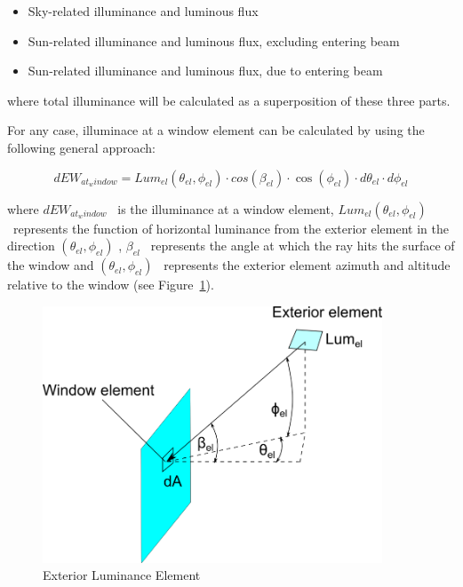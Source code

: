 \begin{itemize}
\item
  Sky-related illuminance and luminous flux
\item
  Sun-related illuminance and luminous flux, excluding entering beam
\item
  Sun-related illuminance and luminous flux, due to entering beam
\end{itemize}

where total illuminance will be calculated as a superposition of these three parts.

For any case, illuminace at a window element can be calculated by using the following general approach:

\begin{equation}
dE{W_{at_window}} = Lu{m_{el}}({\theta_{el}},{\phi_{el}}) \cdot cos({\beta_{el}}) \cdot \cos ({\phi_{el}}) \cdot d{\theta_{el}} \cdot d{\phi_{el}}
\end{equation}

where \(dE{W_{at_window}}\) ~is the illuminance at a window element, \(Lu{m_{el}}({\theta_{el}},{\phi_{el}})\) ~represents the function of horizontal luminance from the exterior element in the direction \(({\theta_{el}},{\phi_{el}})\) , \({\beta_{el}}\) ~represents the angle at which the ray hits the surface of the window and \(({\theta_{el}},{\phi_{el}})\) ~represents the exterior element azimuth and altitude relative to the window (see Figure~\ref{fig:exterior-luminance-element}).

\begin{figure}[hbtp] %
\centering
\includegraphics[width=0.9\textwidth, height=0.9\textheight, keepaspectratio=true]{media/image834.png}
\caption{Exterior Luminance Element \protect \label{fig:exterior-luminance-element}}
\end{figure}


